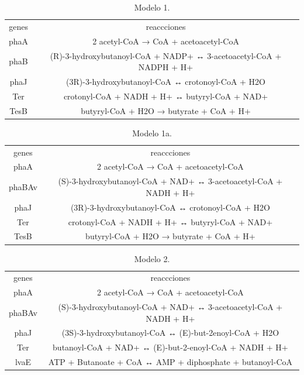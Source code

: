 \documentclass[12pt,spanish]{article}
\begin{document}
\begin{table}[ht]
\begin{tabular}{cc}
genes & reaccciones \\
phaA & 2 acetyl-CoA → CoA + acetoacetyl-CoA \\
phaB & (R)-3-hydroxybutanoyl-CoA + NADP+ ↔ 3-acetoacetyl-CoA + NADPH + H+ \\
phaJ & (3R)-3-hydroxybutanoyl-CoA ↔ crotonoyl-CoA + H2O \\
Ter & crotonyl-CoA + NADH + H+ ↔ butyryl-CoA + NAD+ \\
TesB & butyryl-CoA + H2O → butyrate + CoA + H+
\end{tabular}
\caption{Modelo 1.}\label{tab:via1}
\end{table}



\begin{table}[ht]
\begin{tabular}{cc}
genes & reaccciones \\
phaA & 2 acetyl-CoA → CoA + acetoacetyl-CoA \\
phaBAv & (S)-3-hydroxybutanoyl-CoA + NAD+ ↔ 3-acetoacetyl-CoA + NADH + H+ \\
phaJ & (3R)-3-hydroxybutanoyl-CoA ↔ crotonoyl-CoA + H2O \\
Ter & crotonyl-CoA + NADH + H+ ↔ butyryl-CoA + NAD+ \\
TesB & butyryl-CoA + H2O → butyrate + CoA + H+
\end{tabular}
\caption{Modelo 1a.}\label{tab:via1a}
\end{table}


\begin{table}[ht]
\begin{tabular}{cc}
genes & reaccciones \\
phaA & 2 acetyl-CoA → CoA + acetoacetyl-CoA \\
phaBAv & (S)-3-hydroxybutanoyl-CoA + NAD+ ↔ 3-acetoacetyl-CoA + NADH + H+ \\
phaJ & (3S)-3-hydroxybutanoyl-CoA ↔ (E)-but-2enoyl-CoA + H2O \\
Ter & butanoyl-CoA + NAD+ ↔ (E)-but-2-enoyl-CoA + NADH + H+ \\
lvaE & ATP + Butanoate + CoA ↔ AMP + diphosphate + butanoyl-CoA
\end{tabular}
\caption{Modelo 2.}\label{tab:via2}
\end{table}
\end{document}
